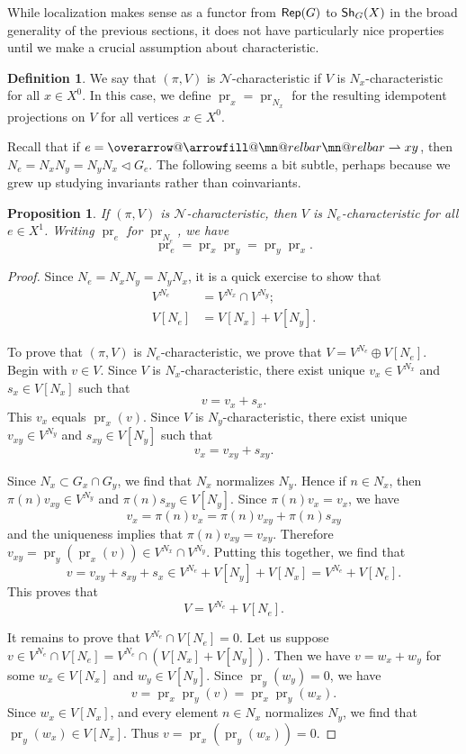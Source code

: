 \documentclass[letter]{amsart}
\makeatletter
\newtheorem{proposition}[thm]{Proposition}
\theoremstyle{definition}
\newtheorem{definition}[thm]{Definition}
\theoremstyle{remark}
\numberwithin{thm}{section}
\numberwithin{equation}{section}
\DeclareRobustCommand{\overrightharpoon}{\mathpalette{\overarrow@\rightharpoonfill@}}
\def\rightharpoonfill@{\arrowfill@\mn@relbar\mn@relbar\rightharpoonup}
\newcommand{\edge}[1]{\overrightharpoon{#1}}
\renewcommand{\NN}{{\mathcal N}}
\newcommand{\ltr}{\triangleleft}
\DeclareMathOperator{\pr}{pr}
\makeatother
\begin{document}
While localization makes sense as a functor from ${\mathsf{Rep}}(G)$ to ${\mathsf{Sh}}_G(X)$ in the broad generality of the previous sections, it does not have particularly nice properties until we make a crucial assumption about characteristic.
\begin{definition}
We say that $(\pi, V)$ is $\NN$-characteristic if $V$ is $N_x$-characteristic for all $x \in X^0$.  In this case, we define $\pr_x = \pr_{N_x}$ for the resulting idempotent projections on $V$ for all vertices $x \in X^0$.
\end{definition}
Recall that if $e = \edge{xy}$, then $N_e = N_x N_y = N_y N_x \ltr G_e$.  The following seems a bit subtle, perhaps because we grew up studying invariants rather than coinvariants.
\begin{proposition}
If $(\pi, V)$ is $\NN$-characteristic, then $V$ is $N_e$-characteristic for all $e \in X^1$.  Writing $\pr_e$ for $\pr_{N_e}$, we have
$$\pr_e = \pr_x \pr_y = \pr_y \pr_x.$$
\end{proposition}
\begin{proof}
Since $N_e = N_x N_y = N_y N_x$, it is a quick exercise to show that
\begin{align*}
V^{N_e} &= V^{N_x} \cap V^{N_y}; \\
V[N_e] &= V[N_x] + V[N_y].
\end{align*}

To prove that $(\pi, V)$ is $N_e$-characteristic, we prove that $V = V^{N_e} \oplus V[N_e]$.  Begin with $v \in V$.  Since $V$ is $N_x$-characteristic, there exist unique $v_x \in V^{N_x}$ and $s_x \in V[N_x]$ such that 
$$v = v_x + s_x.$$
This $v_x$ equals $\pr_x(v)$.  Since $V$ is $N_y$-characteristic, there exist unique $v_{xy} \in V^{N_y}$ and $s_{xy} \in V[N_y]$ such that
$$v_x = v_{xy} + s_{xy}.$$

Since $N_x \subset G_x \cap G_y$, we find that $N_x$ normalizes $N_y$.  Hence if $n \in N_x$, then $\pi(n) v_{xy} \in V^{N_y}$ and $\pi(n) s_{xy} \in V[N_y]$.  Since $\pi(n) v_x = v_x$, we have
$$v_x = \pi(n) v_x = \pi(n) v_{xy} + \pi(n) s_{xy}$$
and the uniqueness implies that $\pi(n) v_{xy} = v_{xy}$.  Therefore $ v_{xy} = \pr_y(\pr_x(v)) \in V^{N_x} \cap V^{N_y}$.  Putting this together, we find that 
$$v = v_{xy} + s_{xy} + s_x \in V^{N_e} + V[N_y] + V[N_x] = V^{N_e} + V[N_e].$$
This proves that 
$$V = V^{N_e} + V[N_e].$$

It remains to prove that $V^{N_e} \cap V[N_e] = 0$.  Let us suppose $v \in V^{N_e} \cap V[N_e] = V^{N_e} \cap (V[N_x] + V[N_y])$.  Then we have $v = w_x + w_y$ for some $w_x \in V[N_x]$ and $w_y \in V[N_y]$.  Since $\pr_y(w_y) = 0$, we have
$$v = \pr_x \pr_y(v) = \pr_x \pr_y(w_x).$$
Since $w_x \in V[N_x]$, and every element $n \in N_x$ normalizes $N_y$, we find that $\pr_y(w_x) \in V[N_x]$.  Thus $v = \pr_x(\pr_y(w_x)) = 0$.  
\end{proof}
\end{document}
